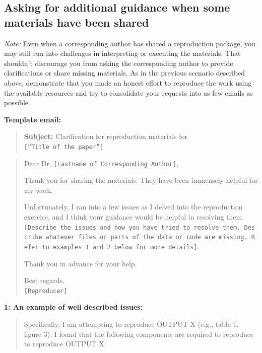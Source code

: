 \documentclass[]{book}
\begin{document}
\hypertarget{asking-for-additional-guidance-when-some-materials-have-been-shared}{%
\subsection{Asking for additional guidance when some materials have been shared}\label{asking-for-additional-guidance-when-some-materials-have-been-shared}}

\emph{Note:} Even when a corresponding author has shared a reproduction package, you may still run into challenges in interpreting or executing the materials. That shouldn't discourage you from asking the corresponding author to provide clarifications or share missing materials. As in the previous scenario described above, demonstrate that you made an honest effort to reproduce the work using the available resources and try to consolidate your requests into as few emails as possible.

\textbf{Template email:}

\begin{quote}
\textbf{Subject:} Clarification for reproduction materials for \texttt{{[}“Title\ of\ the\ paper”{]}}
\end{quote}

\begin{quote}
Dear Dr. \texttt{{[}Lastname\ of\ Corresponding\ Author{]}},

Thank you for sharing the materials. They have been immensely helpful for my work.

Unfortunately, I ran into a few issues as I delved into the reproduction exercise, and I think your guidance would be helpful in resolving them. \texttt{{[}Describe\ the\ issues\ and\ how\ you\ have\ tried\ to\ resolve\ them.\ Describe\ whatever\ files\ or\ parts\ of\ the\ data\ or\ code\ are\ missing.\ Refer\ to\ examples\ 1\ and\ 2\ below\ for\ more\ details{]}}.

Thank you in advance for your help.

Best regards,\\
\texttt{{[}Reproducer{]}}
\end{quote}

\textbf{1: An example of well described issues:}

\begin{quote}
Specifically, I am attempting to reproduce OUTPUT X (e.g., table 1, figure 3). I found that the following components are required to reproduce to reproduce OUTPUT X:
\end{quote}
\end{document}
